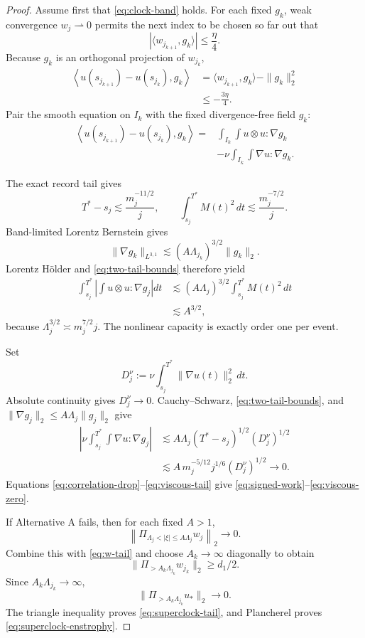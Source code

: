 \documentclass[11pt]{article}
\theoremstyle{remark}
\newcommand{\weakto}{\rightharpoonup}
\begin{document}
\begin{proof}
Assume first that \eqref{eq:clock-band} holds.  For each fixed
\(g_k\), weak convergence \(w_j\weakto0\) permits the next index to be
chosen so far out that
\[
 |\langle w_{j_{k+1}},g_k\rangle|
 \leq\frac{\eta}{4}.
\]
Because \(g_k\) is an orthogonal projection of \(w_{j_k}\),
\begin{align}
 \label{eq:correlation-drop}
 \left\langle
 u(s_{j_{k+1}})-u(s_{j_k}),g_k
 \right\rangle
 &=
 \langle w_{j_{k+1}},g_k\rangle-\|g_k\|_2^2\\
 &\leq-\frac{3\eta}{4}.\nonumber
\end{align}
Pair the smooth equation on \(I_k\) with the fixed divergence-free
field \(g_k\):
\begin{align}
 \label{eq:work-identity}
 \left\langle
 u(s_{j_{k+1}})-u(s_{j_k}),g_k
 \right\rangle
 ={}&
 \int_{I_k}\!\!\int u\otimes u:\nabla g_k\\
 &-
 \nu\int_{I_k}\!\!\int\nabla u:\nabla g_k.\nonumber
\end{align}

The exact record tail gives
\begin{equation}
 \label{eq:two-tail-bounds}
 T^*-s_j\lesssim\frac{m_j^{-11/2}}j,
 \qquad
 \int_{s_j}^{T^*}M(t)^2\,dt
 \lesssim\frac{m_j^{-7/2}}j.
\end{equation}
Band-limited Lorentz Bernstein gives
\[
 \|\nabla g_k\|_{L^{3,1}}
 \lesssim
 (A\Lambda_{j_k})^{3/2}\|g_k\|_2.
\]
Lorentz H\"older and \eqref{eq:two-tail-bounds} therefore yield
\begin{align}
 \label{eq:critical-capacity}
 \int_{s_j}^{T^*}
 \left|\int u\otimes u:\nabla g_j\right|dt
 &\lesssim
 (A\Lambda_j)^{3/2}
 \int_{s_j}^{T^*}M(t)^2\,dt\\
 &\lesssim A^{3/2},\nonumber
\end{align}
because
\(\Lambda_j^{3/2}\asymp m_j^{7/2}j\).
The nonlinear capacity is exactly order one per event.

Set
\[
 D_j^\nu
 :=
 \nu\int_{s_j}^{T^*}\|\nabla u(t)\|_2^2\,dt.
\]
Absolute continuity gives \(D_j^\nu\to0\).  Cauchy--Schwarz,
\eqref{eq:two-tail-bounds}, and
\(\|\nabla g_j\|_2\leq A\Lambda_j\|g_j\|_2\) give
\begin{align}
 \label{eq:viscous-tail}
 \left|
 \nu\int_{s_j}^{T^*}\!\!\int\nabla u:\nabla g_j
 \right|
 &\lesssim
 A\Lambda_j(T^*-s_j)^{1/2}(D_j^\nu)^{1/2}\\
 &\lesssim
 A\,m_j^{-5/12}j^{1/6}(D_j^\nu)^{1/2}
 \longrightarrow0.\nonumber
\end{align}
Equations \eqref{eq:correlation-drop}--\eqref{eq:viscous-tail}
give \eqref{eq:signed-work}--\eqref{eq:viscous-zero}.

If Alternative A fails, then for each fixed \(A>1\),
\[
 \left\|
 \Pi_{\Lambda_j<|\xi|\leq A\Lambda_j}w_j
 \right\|_2\longrightarrow0.
\]
Combine this with \eqref{eq:w-tail} and choose
\(A_k\to\infty\) diagonally to obtain
\[
 \|\Pi_{>A_k\Lambda_{j_k}}w_{j_k}\|_2
 \geq d_1/2.
\]
Since \(A_k\Lambda_{j_k}\to\infty\),
\[
 \|\Pi_{>A_k\Lambda_{j_k}}u_*\|_2\longrightarrow0.
\]
The triangle inequality proves \eqref{eq:superclock-tail}, and
Plancherel proves \eqref{eq:superclock-enstrophy}.
\end{proof}
\end{document}
